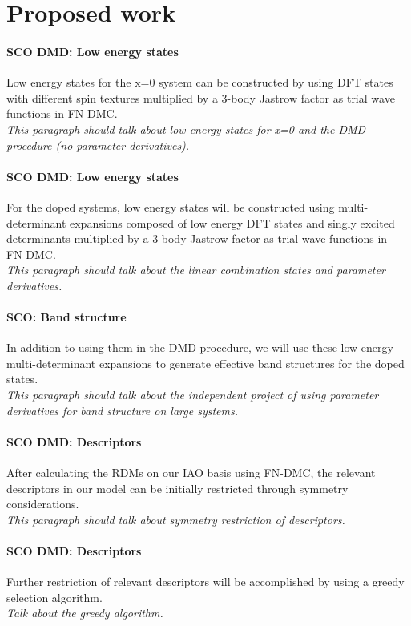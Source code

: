 \documentclass{article}
\begin{document}
\section{Proposed work}
\paragraph{SCO DMD: Low energy states} Low energy states for the x=0 system can be constructed by using DFT states with different spin textures multiplied by a 3-body Jastrow factor as trial wave functions in FN-DMC.
\\
\textit{This paragraph should talk about low energy states for x=0 and the DMD procedure (no parameter derivatives).}

\paragraph{SCO DMD: Low energy states} For the doped systems, low energy states will be constructed using multi-determinant expansions composed of low energy DFT states and singly excited determinants multiplied by a 3-body Jastrow factor as trial wave functions in FN-DMC.
\\
\textit{This paragraph should talk about the linear combination states and parameter derivatives.}

\paragraph{SCO: Band structure} In addition to using them in the DMD procedure, we will use these low energy multi-determinant expansions to generate effective band structures for the doped states.
\\
\textit{This paragraph should talk about the independent project of using parameter derivatives for band structure on large systems.}

\paragraph{SCO DMD: Descriptors} After calculating the RDMs on our IAO basis using FN-DMC, the relevant descriptors in our model can be initially restricted through symmetry considerations.
\\
\textit{This paragraph should talk about symmetry restriction of descriptors.}

\paragraph{SCO DMD: Descriptors} Further restriction of relevant descriptors will be accomplished by using a greedy selection algorithm.
\\
\textit{Talk about the greedy algorithm.}
\end{document}

